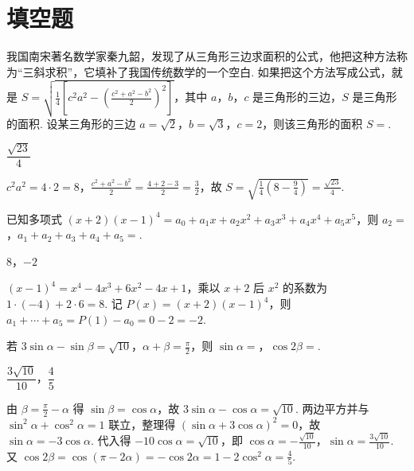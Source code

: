 \section{填空题}

\begin{problem}
我国南宋著名数学家秦九韶，发现了从三角形三边求面积的公式，他把这种方法称为“三斜求积”，它填补了我国传统数学的一个空白. 如果把这个方法写成公式，就是 \(S=\sqrt{\frac14\left[c^2a^2-\left(\frac{c^2+a^2-b^2}{2}\right)^2\right]}\)，其中 \(a\)，\(b\)，\(c\) 是三角形的三边，\(S\) 是三角形的面积. 设某三角形的三边 \(a=\sqrt2\)，\(b=\sqrt3\)，\(c=2\)，则该三角形的面积 \(S=\)\fillinblank{}.
\end{problem}

\begin{answer}
\(\dfrac{\sqrt{23}}{4}\)
\end{answer}

\begin{solution}
\(c^2a^2=4\cdot2=8\)，\(\frac{c^2+a^2-b^2}{2}=\frac{4+2-3}{2}=\frac32\)，故 \(S=\sqrt{\frac14\left(8-\frac94\right)}=\frac{\sqrt{23}}4\).
\end{solution}

\begin{problem}
已知多项式 \((x+2)(x-1)^4=a_0+a_1x+a_2x^2+a_3x^3+a_4x^4+a_5x^5\)，则 \(a_2=\)\fillinblank{}，\(a_1+a_2+a_3+a_4+a_5=\)\fillinblank{}.
\end{problem}

\begin{answer}
\(8\)，\(-2\)
\end{answer}

\begin{solution}
\((x-1)^4=x^4-4x^3+6x^2-4x+1\)，乘以 \(x+2\) 后 \(x^2\) 的系数为 \(1\cdot(-4)+2\cdot6=8\). 记 \(P(x)=(x+2)(x-1)^4\)，则 \(a_1+\cdots+a_5=P(1)-a_0=0-2=-2\).
\end{solution}

\begin{problem}
若 \(3\sin\alpha-\sin\beta=\sqrt{10}\)，\(\alpha+\beta=\frac{\pi}{2}\)，则 \(\sin\alpha=\)\fillinblank{}，\(\cos 2\beta=\)\fillinblank{}.
\end{problem}

\begin{answer}
\(\dfrac{3\sqrt{10}}{10}\)，\(\dfrac45\)
\end{answer}

\begin{solution}
由 \(\beta=\frac\pi2-\alpha\) 得 \(\sin\beta=\cos\alpha\)，故 \(3\sin\alpha-\cos\alpha=\sqrt{10}\). 两边平方并与 \(\sin^2\alpha+\cos^2\alpha=1\) 联立，整理得 \((\sin\alpha+3\cos\alpha)^2=0\)，故 \(\sin\alpha=-3\cos\alpha\). 代入得 \(-10\cos\alpha=\sqrt{10}\)，即 \(\cos\alpha=-\frac{\sqrt{10}}{10}\)，\(\sin\alpha=\frac{3\sqrt{10}}{10}\). 又 \(\cos2\beta=\cos(\pi-2\alpha)=-\cos2\alpha=1-2\cos^2\alpha=\frac45\).
\end{solution}

